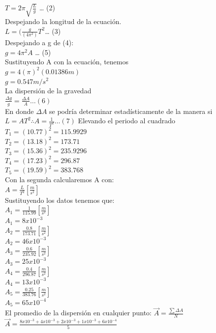 \documentclass[10pt]{article}
\begin{document}
\begin{multicols}{2}
$T= 2\pi  \sqrt{\frac{L}{g}} $        … (2)\\
Despejando la longitud de la ecuación. \\
$L=(\frac{g}{(4\pi^2 )} T^2 $… (3)\\
Despejando a g de (4):\\
 $g=4\pi^2 A$ … (5)\\
Sustituyendo A con la ecuación, tenemos \\
$g= 4(\pi)^2 (0.01386m)$\\
$g=0.547 m/s^2 $\\
La dispersión de la gravedad \\
$\frac{\Delta g}{g}=\frac{\Delta A}{A}  …(6)$ \\
En donde $\Delta A$ se podría determinar estadísticamente de la manera si \\
$L=AT^2       \therefore           A=\frac{1}{T^2}         … (7)$
Elevando el periodo al cuadrado\\ 
$T_{1}= (10.77)^2=115.9929$ \\
$T_{2}= (13.18)^2=173.71 $ \\
$T_{3}= (15.36)^2=235.9296$ \\
$T_{4}= (17.23)^2=296.87$ \\
$T_{5}= (19.59)^2=383.768$ \\
Con la segunda calcularemos A con:  \\	
$A=\frac{L}{T^2}  [\frac{m}{s^2} ]$ \\
Sustituyendo los datos tenemos que: \\
$A_{1}=\frac{1}{115.99} [\frac{m}{s^2} ]$\\	
$A_{1}=8x10^{-3}$\\	
$A_{2}=\frac{0.8}{173.71} [\frac{m}{s^2} ]$\\	
$A_{2}=46x10^{-3}$\\	
$A_{3}=\frac{0.6}{235.92} [\frac{m}{s^2} ]$\\	
$A_{3}=25x10^{-3}$\\	
$A_{4}=\frac{0.4}{296.87} [\frac{m}{s^2} ]$\\	
$A_{4}=13x10^{-3}$\\	
$A_{5}=\frac{0.25}{383.76} [\frac{m}{s^2} ]$\\	
$A_{5}=65x10^{-4}$\\	
El promedio de la dispersión en cualquier punto:
$\vec{A} =\frac{\sum \Delta A}{N}$\\

$\vec{A}= \frac{8x10^{-3}+4x10^{-3}+2x10^{-3}+ 1x10^{-3}+ 6x10^{-4}}{5}$\\


\end{multicols}
\end{document}
